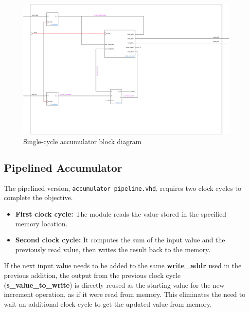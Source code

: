 \documentclass[a4paper,12pt]{article}
\begin{document}
\begin{figure}[H]
    \centering
    \includegraphics[width=1.0\linewidth]{accumulator_single_cycle.png}
    \caption{Single-cycle accumulator block diagram}
    \label{fig:single_cycle}
\end{figure}


\subsection{Pipelined Accumulator}
The pipelined version, \texttt{accumulator\_pipeline.vhd}, requires two clock cycles to complete the objective.
\begin{itemize}
    \item \textbf{First clock cycle:} The module reads the value stored in the specified memory location.
    \item \textbf{Second clock cycle:} It computes the sum of the input value and the previously read value, then writes the result back to the memory.
\end{itemize}
    

If the next input value needs to be added to the same \textbf{write\_addr} used in the previous addition, the output from the previous clock cycle (\textbf{s\_value\_to\_write}) is directly reused as the starting value for the new increment operation, as if it were read from memory. This eliminates the need to wait an additional clock cycle to get the updated value from memory.
\end{document}
